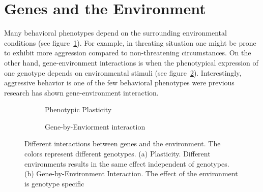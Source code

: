 \section{Genes and the Environment}
\label{sec:gene_environment_interactions}

Many behavioral phenotypes depend on the surrounding environmental conditions (see figure~\ref{fig:plasticity}).
For example, in threating situation one might be prone to exhibit more aggression compared to non-threatening circumstances. 
On the other hand, gene-environment interactions is when the phenotypical expression of one genotype depends on environmental stimuli (see figure~\ref{fig:gene_env_interaction}).
Interestingly, aggressive behavior is one of the few behavioral phenotypes were previous research has shown gene-environment interaction.

\begin{figure}[!htp]
  \centering
  \begin{subfigure}[b]{0.5\textwidth}
    \centering
    \resizebox{\linewidth}{!}{}
    \caption{Phenotypic Plasticity}\label{fig:plasticity}
  \end{subfigure}
  \begin{subfigure}[b]{0.5\textwidth}
    \centering
    \resizebox{\linewidth}{!}{}
    \caption{Gene-by-Enviorment interaction}\label{fig:gene_env_interaction}
  \end{subfigure}
  \caption{Different interactions between genes and the environment. 
    The colors represent different genotypes. 
    (a) Plasticity. Different environments results in the same effect independent of genotypes.
    (b) Gene-by-Environment Interaction. The effect of the environment is genotype specific}\label{fig:env_interactions}
\end{figure}

